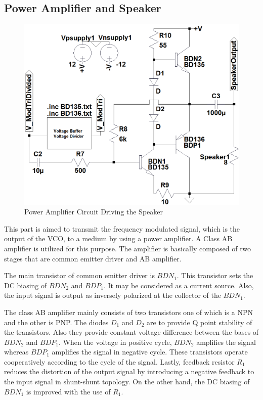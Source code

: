 \documentclass[paper]{IEEEtran}
\begin{document}
\subsection{Power Amplifier and Speaker}
\begin{figure}[t!]
 \setlength{\unitlength}{\textwidth}
 \center 
 \includegraphics[width=0.45\unitlength]{PowerAmp_Circuit_FinalModified}
 \caption{\label{fig:PowerAmp_Circuit}Power Amplifier Circuit Driving the Speaker}
\end{figure}
This part is aimed to transmit the frequency modulated signal, which is the output of the VCO, to a medium by using a power amplifier. A Class AB amplifier is utilized for this purpose. The amplifier is basically composed of two stages that are common emitter driver and AB amplifier.

The main transistor of common emitter driver is $BDN_{1}$. This transistor sets the DC biasing of $BDN_{2}$ and $BDP_{1}$. It may be considered as a current source. Also, the input signal is output as inversely polarized at the collector of the $BDN_{1}$.

The class AB amplifier mainly consists of two transistors one of which is a NPN and the other is PNP. The diodes $D_{1}$ and $D_{2}$ are to provide Q point stability of the transistors. Also they provide constant voltage difference between the bases of $BDN_{2}$ and $BDP_{1}$. When the voltage in positive cycle, $BDN_{2}$ amplifies the signal whereas $BDP_{1}$ amplifies the signal in negative cycle. These transistors operate cooperatively according to the cycle of the signal. Lastly, feedback resistor $R_{1}$ reduces the distortion of the output signal by introducing a negative feedback to the input signal in shunt-shunt topology. On the other hand, the DC biasing of $BDN_{1}$ is improved with the use of $R_{1}$.
\end{document}
